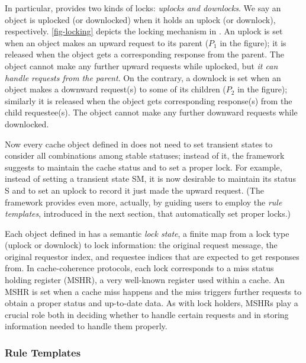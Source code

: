 \documentclass[sigplan,10pt,review,anonymous,screen]{acmart}\settopmatter{printfolios=true,printccs=false,printacmref=false}
\begin{document}
In particular, \hemiola{} provides two kinds of locks: \emph{uplocks and downlocks}.
We say an object is uplocked (or downlocked) when it holds an uplock (or downlock), respectively.
\autoref{fig-locking} depicts the locking mechanism in \hemiola{}.
An uplock is set when an object makes an upward request to its parent ($P_1$ in the figure); it is released when the object gets a corresponding response from the parent.
The object cannot make any further upward requests while uplocked, but \emph{it can handle requests from the parent}.
On the contrary, a downlock is set when an object makes a downward request(s) to some of its children ($P_2$ in the figure); similarly it is released when the object gets corresponding response(s) from the child requestee(s).
The object cannot make any further downward requests while downlocked.

Now every cache object defined in \hemiola{} does not need to set transient states to consider all combinations among stable statuses;
instead of it, the framework suggests to maintain the cache status and to set a proper lock.
For example, instead of setting a transient state SM, it is now desirable to maintain its status S and to set an uplock to record it just made the upward request.
(The framework provides even more, actually, by guiding users to employ the \emph{rule templates}, introduced in the next section, that automatically set proper locks.)

Each object defined in \hemiola{} has a semantic \emph{lock state}, a finite map from a lock type (uplock or downlock) to lock information: the original request message, the original requestor index, and requestee indices that are expected to get responses from.
In cache-coherence protocols, each lock corresponds to a miss status holding register (MSHR), a very well-known register used within a cache.
An MSHR is set when a cache miss happens and the miss triggers further requests to obtain a proper status and up-to-date data.
As with \hemiola{} lock holders, MSHRs play a crucial role both in deciding whether to handle certain requests and in storing information needed to handle them properly.

\subsubsection{Rule Templates}
\label{sec-rule-templates}

\newcommand{\rtname}[1]{{\small\sf\bf #1}}

\newcommand{\uled}{\ensuremath{\textsf{UL}}}
\newcommand{\dled}{\ensuremath{\textsf{DL}}}
\newcommand{\ulfree}{\ensuremath{\textsf{UL}_{\times}}}
\newcommand{\dlfree}{\ensuremath{\textsf{DL}_{\times}}}
\end{document}
